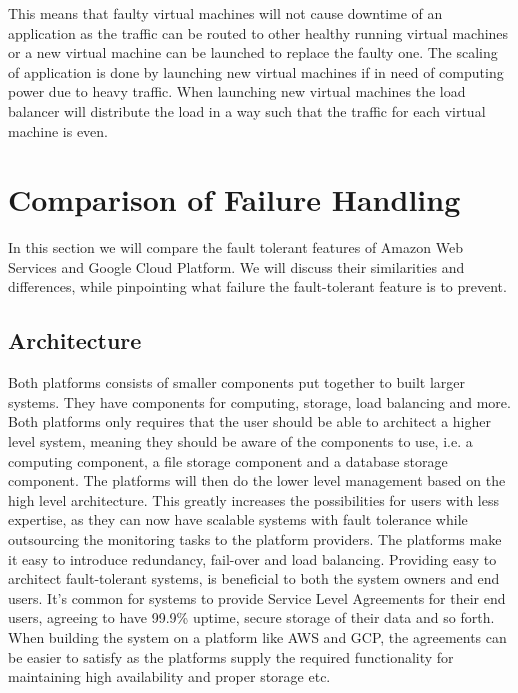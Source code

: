 \documentclass[11pt]{report}
\begin{document}
This means that faulty virtual machines will not cause downtime of an application as the traffic can be routed to other healthy running virtual machines or a new virtual machine can be launched to replace the faulty one. The scaling of application is done by launching new virtual machines if in need of computing power due to heavy traffic. When launching new virtual machines the load balancer will distribute the load in a way such that the traffic for each virtual machine is even.

\chapter{Comparison of Failure Handling}
In this section we will compare the fault tolerant features of Amazon Web Services and Google Cloud Platform. We will discuss their similarities and differences, while pinpointing what failure the fault-tolerant feature is to prevent.

\section{Architecture}
Both platforms consists of smaller components put together to built larger systems. They have components for computing, storage, load balancing and more. Both platforms only requires that the user should be able to architect a higher level system, meaning they should be aware of the components to use, i.e. a computing component, a file storage component and a database storage component. The platforms will then do the lower level management based on the high level architecture. This greatly increases the possibilities for users with less expertise, as they can now have scalable systems with fault tolerance while outsourcing the monitoring tasks to the platform providers. The platforms make it easy to introduce redundancy, fail-over and load balancing. Providing easy to architect fault-tolerant systems, is beneficial to both the system owners and end users. It's common for systems to provide Service Level Agreements for their end users, agreeing to have 99.9\% uptime, secure storage of their data and so forth. When building the system on a platform like AWS and GCP, the agreements can be easier to satisfy as the platforms supply the required functionality for maintaining high availability and proper storage etc. 
\end{document}
